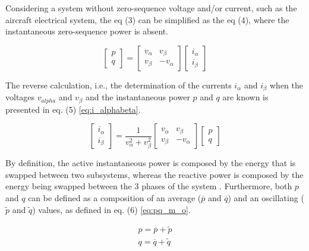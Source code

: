 Considering a system without zero-sequence voltage and/or current, such as the aircraft electrical system, the eq (3) can be simplified as the eq (4), where the instantaneous zero-sequence power is absent.

\begin{equation}
\begin{bmatrix}
p\\
q
\end{bmatrix}=
\begin{bmatrix}
v_{\alpha}	&	v_{\beta}\\
v_{\beta}	&	-v_{\alpha}
\end{bmatrix}
\begin{bmatrix}
i_{\alpha}\\
i_{\beta}
\end{bmatrix}
\label{eq:pq}
\end{equation} 

The reverse calculation, i.e., the determination of the currents $i_{\alpha}$ and $i_{\beta}$ when the voltages $v_{alpha}$ and $v_{\beta}$ and the instantaneous power $p$ and $q$ are known is presented in eq. (5) \ref{eq:i_alphabeta}.

\begin{equation}
\begin{bmatrix}
i_{\alpha}\\
i_{\beta}
\end{bmatrix}=
\dfrac{1}{v_{\alpha}^2+v_{\beta}^2}
\begin{bmatrix}
v_{\alpha}	&	v_{\beta}\\
v_{\beta}	&	-v_{\alpha}
\end{bmatrix}
\begin{bmatrix}
p\\
q
\end{bmatrix}
\label{eq:i_alphabeta}
\end{equation}

By definition, the active instantaneous power is composed by the energy that is swapped between two subsystems, whereas the reactive power is composed by the energy being swapped between the 3 phases of the system \cite{Akagi}. Furthermore, both $p$ and $q$ can be defined as a composition of an average ($\overline{p}$ and $\overline{q}$) and an oscillating ($\tilde{p}$ and $\tilde{q}$) values, as defined in eq. (6) \ref{eq:pq_m_o}.

\begin{equation}
\begin{aligned}
p = \overline{p} + \tilde{p}\\
q = \overline{q} + \tilde{q} 
\end{aligned}
\label{eq:pq_m_o}
\end{equation} 

